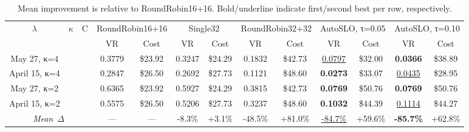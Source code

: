 \documentclass{article}
\begin{document}
\begin{table}[t]
\centering
\footnotesize
\setlength{\tabcolsep}{2.5pt}
\caption{Mean improvement is relative to RoundRobin16+16. Bold/underline indicate first/second best per row, respectively.}\label{tab:todo}
\begin{tabular}{c c c || c c | c c | c c | c c | c c}
\toprule
$\lambda$ & $\kappa$ & C & \multicolumn{2}{c|}{RoundRobin16+16} & \multicolumn{2}{c|}{Single32} & \multicolumn{2}{c|}{RoundRobin32+32} & \multicolumn{2}{c|}{AutoSLO, τ=0.05} & \multicolumn{2}{c}{AutoSLO, τ=0.10} \\
 &  &  & VR & Cost & VR & Cost & VR & Cost & VR & Cost & VR & Cost \\
\hline
May 27, κ=4 &  &  & 0.3779 & \$23.92 & 0.3247 & \$24.29 & 0.1832 & \$42.73 & \underline{0.0797} & \$32.00 & \textbf{0.0366} & \$38.89 \\
April 15, κ=4 &  &  & 0.2847 & \$26.50 & 0.2692 & \$27.73 & 0.1121 & \$48.60 & \textbf{0.0273} & \$33.07 & \underline{0.0435} & \$28.95 \\
May 27, κ=2 &  &  & 0.6365 & \$23.92 & 0.5927 & \$24.29 & 0.3815 & \$42.73 & \textbf{0.0769} & \$50.76 & \textbf{0.0769} & \$50.76 \\
April 15, κ=2 &  &  & 0.5575 & \$26.50 & 0.5206 & \$27.73 & 0.3237 & \$48.60 & \textbf{0.1032} & \$44.39 & \underline{0.1114} & \$44.27 \\
\hline
\multicolumn{3}{c||}{\textit{Mean~$\Delta$}} & --- & --- & -8.3\% & +3.1\% & -48.5\% & +81.0\% & \underline{-84.7\%} & +59.6\% & \textbf{-85.7\%} & +62.8\% \\
\bottomrule
\end{tabular}
\end{table}
\end{document}
